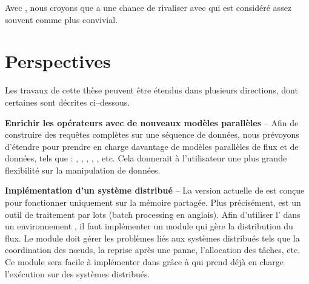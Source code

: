 \begin{conclusion}
Avec , nous croyons que  a une chance de rivaliser avec  qui est consid\'er\'e assez souvent comme plus convivial. 


\section*{\textbf{Perspectives}}

Les travaux de cette th\`ese peuvent \^etre \'etendus dans plusieurs directions, dont certaines sont d\'ecrites ci--dessous.

\textbf{Enrichir les op\'erateurs avec de nouveaux mod\`eles parall\`eles} -- Afin de construire des requ\^etes compl\`etes sur une s\'equence de donn\'ees, nous pr\'evoyons d'\'etendre  pour prendre en charge davantage de mod\`eles parall\`eles de flux et de donn\'ees, tels que : , , , , , etc. Cela donnerait \`a l'utilisateur une plus grande flexibilit\'e sur la manipulation de donn\'ees.

\textbf{Impl\'ementation d'un syst\`eme distribu\'e} -- La version actuelle de  est con\c cue pour fonctionner uniquement sur la m\'emoire partag\'ee. Plus pr\'ecis\'ement,  est un outil de traitement par lots (batch processing en anglais). Afin d'utiliser l' dans un environnement , il faut impl\'ementer un module qui g\`ere la distribution du flux. Le module doit g\'erer les probl\`emes li\'es aux syst\`emes distribu\'es tels que la coordination des nœuds, la reprise apr\`es une panne, l'allocation des t\^aches, etc. Ce module sera facile \`a impl\'ementer dans  gr\^ace \`a  qui prend d\'ej\`a en charge l'ex\'ecution sur des syst\`emes distribu\'es.


\end{conclusion}




